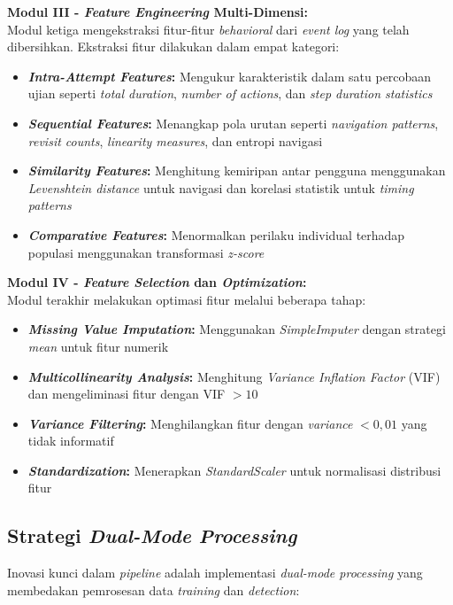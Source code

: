 \textbf{Modul III - \textit{Feature Engineering} Multi-Dimensi:} \\
Modul ketiga mengekstraksi fitur-fitur \textit{behavioral} dari \textit{event log} yang telah dibersihkan. Ekstraksi fitur dilakukan dalam empat kategori:
\begin{itemize}
    \item \textbf{\textit{Intra-Attempt Features}:} Mengukur karakteristik dalam satu percobaan ujian seperti \textit{total duration}, \textit{number of actions}, dan \textit{step duration statistics}
    \item \textbf{\textit{Sequential Features}:} Menangkap pola urutan seperti \textit{navigation patterns}, \textit{revisit counts}, \textit{linearity measures}, dan entropi navigasi
    \item \textbf{\textit{Similarity Features}:} Menghitung kemiripan antar pengguna menggunakan \textit{Levenshtein distance} untuk navigasi dan korelasi statistik untuk \textit{timing patterns}
    \item \textbf{\textit{Comparative Features}:} Menormalkan perilaku individual terhadap populasi menggunakan transformasi \textit{z-score}
\end{itemize}

\textbf{Modul IV - \textit{Feature Selection} dan \textit{Optimization}:} \\
Modul terakhir melakukan optimasi fitur melalui beberapa tahap:
\begin{itemize}
    \item \textbf{\textit{Missing Value Imputation}:} Menggunakan \textit{SimpleImputer} dengan strategi \textit{mean} untuk fitur numerik
    \item \textbf{\textit{Multicollinearity Analysis}:} Menghitung \textit{Variance Inflation Factor} (VIF) dan mengeliminasi fitur dengan VIF $>10$
    \item \textbf{\textit{Variance Filtering}:} Menghilangkan fitur dengan \textit{variance} $<0,01$ yang tidak informatif
    \item \textbf{\textit{Standardization}:} Menerapkan \textit{StandardScaler} untuk normalisasi distribusi fitur
\end{itemize}

\subsection{Strategi \textit{Dual-Mode Processing}}
\label{sec:dualModeStrategy}

Inovasi kunci dalam \textit{pipeline} adalah implementasi \textit{dual-mode processing} yang membedakan pemrosesan data \textit{training} dan \textit{detection}:

